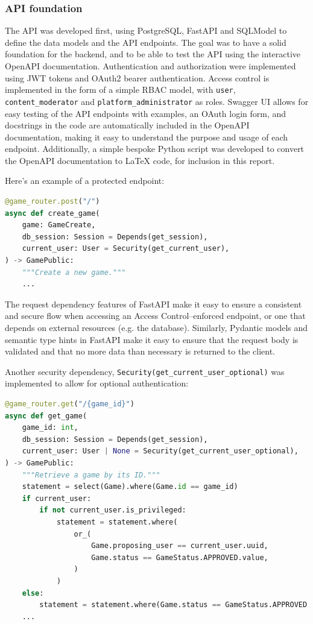 \documentclass[11pt,italian,a4paper]{article}
\begin{document}
\subsubsection{API foundation}
The API was developed first, using PostgreSQL, FastAPI and SQLModel to define the data models and the API endpoints. The goal was to have a solid foundation for the backend, and to be able to test the API using the interactive OpenAPI documentation. Authentication and authorization were implemented using JWT tokens and OAuth2 bearer authentication. Access control is implemented in the form of a simple RBAC model, with \texttt{user}, \texttt{content\_moderator} and \texttt{platform\_administrator} as roles. Swagger UI allows for easy testing of the API endpoints with examples, an OAuth login form, and docstrings in the code are automatically included in the OpenAPI documentation, making it easy to understand the purpose and usage of each endpoint. Additionally, a simple bespoke Python script was developed to convert the OpenAPI documentation to \LaTeX{} code, for inclusion in this report.

Here's an example of a protected endpoint:
\begin{lstlisting}[language=Python]
@game_router.post("/")
async def create_game(
    game: GameCreate,
    db_session: Session = Depends(get_session),
    current_user: User = Security(get_current_user),
) -> GamePublic:
    """Create a new game."""
    ...
\end{lstlisting}

The request dependency features of FastAPI make it easy to ensure a consistent and secure flow when accessing an Access Control--enforced endpoint, or one that depends on external resources (e.g. the database). Similarly, Pydantic models and semantic type hints in FastAPI make it easy to ensure that the request body is validated and that no more data than necessary is returned to the client.

Another security dependency, \texttt{Security(get\_current\_user\_optional)} was implemented to allow for optional authentication:

\begin{lstlisting}[language=Python]
@game_router.get("/{game_id}")
async def get_game(
    game_id: int,
    db_session: Session = Depends(get_session),
    current_user: User | None = Security(get_current_user_optional),
) -> GamePublic:
    """Retrieve a game by its ID."""
    statement = select(Game).where(Game.id == game_id)
    if current_user:
        if not current_user.is_privileged:
            statement = statement.where(
                or_(
                    Game.proposing_user == current_user.uuid,
                    Game.status == GameStatus.APPROVED.value,
                )
            )
    else:
        statement = statement.where(Game.status == GameStatus.APPROVED.value)
    ...
\end{lstlisting}
\end{document}
